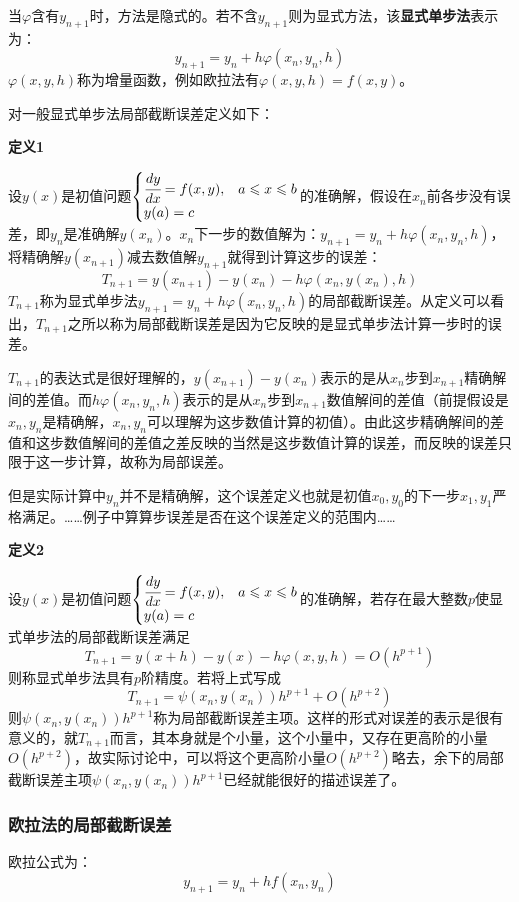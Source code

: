 当$\varphi$含有$y_{n+1}$时，方法是隐式的。若不含$y_{n+1}$则为显式方法，该\textbf{显式单步法}表示为：
$$y_{n+1}=y_n+h\varphi(x_n,y_n,h)$$
$\varphi(x,y,h)$称为增量函数，例如欧拉法有$\varphi(x,y,h)=f(x,y)$。

对一般显式单步法局部截断误差定义如下：

\textbf{定义1}

设$y(x)$是初值问题$\begin{cases}\cfrac{dy}{dx}=f(x,y),&a\le x\le b\\
y(a)=c &\end{cases}$的准确解，假设在$x_n$前各步没有误差，即$y_n$是准确解$y(x_n)$。$x_n$下一步的数值解为：$y_{n+1}=y_n+h\varphi(x_n,y_n,h)$，将精确解$y(x_{n+1})$减去数值解$y_{n+1}$就得到计算这步的误差：
$$T_{n+1}=y(x_{n+1})-y(x_n)-h\varphi(x_n,y(x_n),h)$$
$T_{n+1}$称为显式单步法$y_{n+1}=y_n+h\varphi(x_n,y_n,h)$的局部截断误差。从定义可以看出，$T_{n+1}$之所以称为局部截断误差是因为它反映的是显式单步法计算一步时的误差。

$T_{n+1}$的表达式是很好理解的，$y(x_{n+1})-y(x_n)$表示的是从$x_n$步到$x_{n+1}$精确解间的差值。而$h\varphi(x_n,y_n,h)$表示的是从$x_n$步到$x_{n+1}$数值解间的差值（前提假设是$x_n,y_n$是精确解，$x_n,y_n$可以理解为这步数值计算的初值）。由此这步精确解间的差值和这步数值解间的差值之差反映的当然是这步数值计算的误差，而反映的误差只限于这一步计算，故称为局部误差。

但是实际计算中$y_n$并不是精确解，这个误差定义也就是初值$x_0,y_0$的下一步$x_1,y_1$严格满足。……例子中算算步误差是否在这个误差定义的范围内……


\textbf{定义2}

设$y(x)$是初值问题$\begin{cases}\cfrac{dy}{dx}=f(x,y),&a\le x\le b\\y(a)=c &\end{cases}$的准确解，若存在最大整数$p$使显式单步法的局部截断误差满足
$$T_{n+1}=y(x+h)-y(x)-h\varphi(x,y,h)=O(h^{p+1})$$
则称显式单步法具有$p$阶精度。若将上式写成
$$T_{n+1}=\psi(x_n,y(x_n))h^{p+1}+O(h^{p+2})$$
则$\psi(x_n,y(x_n))h^{p+1}$称为局部截断误差主项。这样的形式对误差的表示是很有意义的，就$T_{n+1}$而言，其本身就是个小量，这个小量中，又存在更高阶的小量$O(h^{p+2})$，故实际讨论中，可以将这个更高阶小量$O(h^{p+2})$略去，余下的局部截断误差主项$\psi(x_n,y(x_n))h^{p+1}$已经就能很好的描述误差了。

\subsubsection{欧拉法的局部截断误差}
欧拉公式为：
$$y_{n+1}=y_n+hf(x_n,y_n)$$

